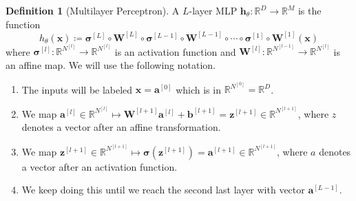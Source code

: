 \documentclass{article}
\theoremstyle{definition}
\theoremstyle{remark}
\theoremstyle{definition}
\newtheorem{definition}{Definition}[section]
\begin{document}
    \begin{definition}[Multilayer Perceptron]
      A $L$-layer MLP $\mathbf{h}_\theta : \mathbb{R}^D \longrightarrow \mathbb{R}^M$ is the function 
        \[h_\theta (\mathbf{x}) \coloneqq \boldsymbol{\sigma}^{[L]} \circ \mathbf{W}^{[L]} \circ \boldsymbol{\sigma}^{[L-1]} \circ \mathbf{W}^{[L-1]} \circ \cdots \circ \boldsymbol{\sigma}^{[1]} \circ \mathbf{W}^{[1]} (\mathbf{x})\]
      where $\boldsymbol{\sigma}^{[l]}: \mathbb{R}^{N^{[l]}} \rightarrow \mathbb{R}^{N^{[l]}}$ is an activation function and $\mathbf{W}^{[l]}: \mathbb{R}^{N^{[l-1]}} \rightarrow \mathbb{R}^{N^{[l]}}$ is an affine map. We will use the following notation. 
      \begin{enumerate}
        \item The inputs will be labeled $\mathbf{x} = \mathbf{a}^{[0]}$ which is in $\mathbb{R}^{N^{[0]}} = \mathbb{R}^D$. 
        
        \item We map $\mathbf{a}^{[l]} \in \mathbb{R}^{N^{[l]}} \mapsto \mathbf{W}^{[l+1]} \mathbf{a}^{[l]} + \mathbf{b}^{[l+1]}= \mathbf{z}^{[l+1]} \in \mathbb{R}^{N^{[l+1]}}$, where $z$ denotes a vector after an affine transformation. 

        \item We map $\mathbf{z}^{[l+1]} \in \mathbb{R}^{N^{[l+1]}} \mapsto \boldsymbol{\sigma}(\mathbf{z}^{[l+1]}) = \mathbf{a}^{[l+1]} \in \mathbb{R}^{N^{[l+1]}}$, where $a$ denotes a vector after an activation function. 

        \item We keep doing this until we reach the second last layer with vector $\mathbf{a}^{[L-1]}$. 


\end{enumerate}
\end{definition}
\end{document}
